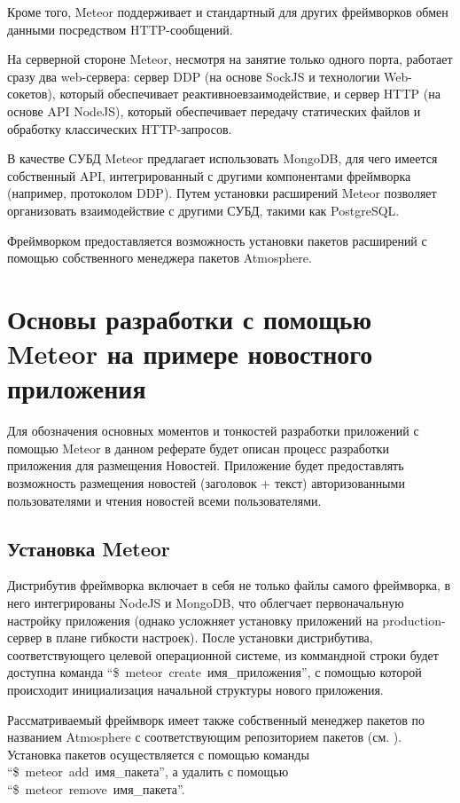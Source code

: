 \documentclass[a4paper,12pt]{article}
\begin{document}
Кроме того, Meteor поддерживает и стандартный для других фреймворков обмен данными
посредством HTTP-сообщений.

На серверной стороне Meteor, несмотря на занятие только одного порта,
работает сразу два web-сервера: сервер DDP (на основе SockJS и технологии
Web-сокетов), который обеспечивает реактивноевзаимодействие, и сервер HTTP (на
основе API NodeJS), который обеспечивает передачу статических файлов и
обработку классических HTTP-запросов.

В качестве СУБД Meteor предлагает использовать MongoDB, для чего имеется
собственный API, интегрированный с другими компонентами фреймворка (например,
протоколом DDP). Путем установки расширений Meteor позволяет организовать 
взаимодействие с другими СУБД, такими как PostgreSQL.

Фреймворком предоставляется возможность установки пакетов расширений
с помощью собственного менеджера пакетов Atmosphere.

\section{Основы разработки с помощью Meteor на примере новостного приложения}
Для обозначения основных моментов и тонкостей разработки приложений с помощью
Meteor в данном реферате будет описан процесс разработки приложения для размещения
Новостей. Приложение будет предоставлять возможность размещения новостей
(заголовок + текст) авторизованными пользователями и чтения новостей
всеми пользователями.

\subsection{Установка Meteor}

Дистрибутив фреймворка включает в себя не только файлы самого фреймворка, 
в него интегрированы NodeJS и MongoDB, что облегчает
первоначальную настройку приложения (однако усложняет установку приложений 
на production-сервер в плане гибкости настроек). После
установки дистрибутива, соответствующего целевой операционной системе,
из коммандной строки будет доступна команда ``\$~meteor~create~имя\_приложения'',
с помощью которой происходит инициализация начальной структуры нового приложения.

Рассматриваемый фреймворк имеет также собственный менеджер пакетов по названием
Atmosphere с соответствующим репозиторием пакетов (см. \cite{atmosphere}).
Установка пакетов осуществляется с помощью команды ``\$~meteor~add~имя\_пакета'',
а удалить с помощью ``\$~meteor~remove~имя\_пакета''.
\end{document}
